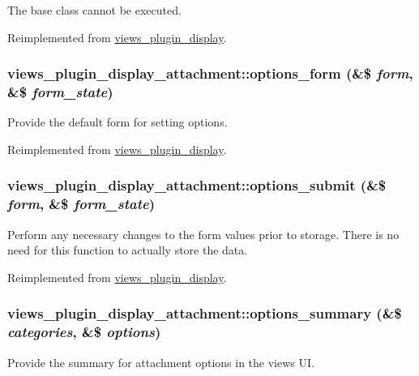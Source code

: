 The base class cannot be executed. 

Reimplemented from \hyperlink{classviews__plugin__display_af99c4a303d3e409ab7b14c6cfcd3a1d8}{views\_\-plugin\_\-display}.\hypertarget{classviews__plugin__display__attachment_a82864b279fb83e8d9ebddc40bc2851fa}{
\subsubsection[{options\_\-form}]{\setlength{\rightskip}{0pt plus 5cm}views\_\-plugin\_\-display\_\-attachment::options\_\-form (\&\$ {\em form}, \/  \&\$ {\em form\_\-state})}}
\label{classviews__plugin__display__attachment_a82864b279fb83e8d9ebddc40bc2851fa}
Provide the default form for setting options. 

Reimplemented from \hyperlink{classviews__plugin__display_ad9c69d91ea1165ff51dcd1f1f6d3a154}{views\_\-plugin\_\-display}.\hypertarget{classviews__plugin__display__attachment_a63219dfd2bfed59bdf1840d704d11799}{
\subsubsection[{options\_\-submit}]{\setlength{\rightskip}{0pt plus 5cm}views\_\-plugin\_\-display\_\-attachment::options\_\-submit (\&\$ {\em form}, \/  \&\$ {\em form\_\-state})}}
\label{classviews__plugin__display__attachment_a63219dfd2bfed59bdf1840d704d11799}
Perform any necessary changes to the form values prior to storage. There is no need for this function to actually store the data. 

Reimplemented from \hyperlink{classviews__plugin__display_a75f0b2d5587b365640fcb4d414daae36}{views\_\-plugin\_\-display}.\hypertarget{classviews__plugin__display__attachment_a0d54f6bd68c3ebba7af03cd7ac722fe0}{
\subsubsection[{options\_\-summary}]{\setlength{\rightskip}{0pt plus 5cm}views\_\-plugin\_\-display\_\-attachment::options\_\-summary (\&\$ {\em categories}, \/  \&\$ {\em options})}}
\label{classviews__plugin__display__attachment_a0d54f6bd68c3ebba7af03cd7ac722fe0}
Provide the summary for attachment options in the views UI.


